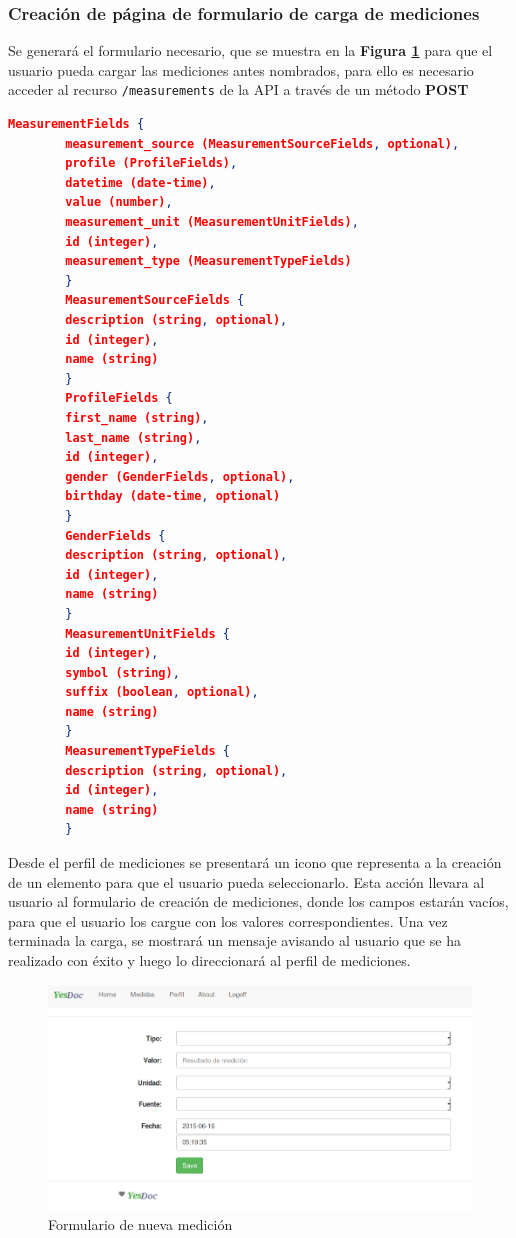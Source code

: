 \subsubsection{Creación de página de formulario de carga de mediciones}
Se generará el formulario necesario, que se muestra en la \textbf{Figura \ref{nueva_medicion}} para que el usuario pueda cargar las mediciones antes nombrados, para ello es necesario acceder al recurso \texttt{/measurements} de la API a través de un método \textbf{POST}

      \begin{lstlisting}[language=json,firstnumber=1]
         MeasurementFields {
        measurement_source (MeasurementSourceFields, optional),
        profile (ProfileFields),
        datetime (date-time),
        value (number),
        measurement_unit (MeasurementUnitFields),
        id (integer),
        measurement_type (MeasurementTypeFields)
        }
        MeasurementSourceFields {
        description (string, optional),
        id (integer),
        name (string)
        }
        ProfileFields {
        first_name (string),
        last_name (string),
        id (integer),
        gender (GenderFields, optional),
        birthday (date-time, optional)
        }
        GenderFields {
        description (string, optional),
        id (integer),
        name (string)
        }
        MeasurementUnitFields {
        id (integer),
        symbol (string),
        suffix (boolean, optional),
        name (string)
        }
        MeasurementTypeFields {
        description (string, optional),
        id (integer),
        name (string)
        } 
    \end{lstlisting}
    
Desde el perfil de mediciones se presentará un icono que representa a la creación de un elemento para que el usuario pueda seleccionarlo. Esta acción llevara al usuario al formulario de creación de mediciones, donde los campos estarán vacíos, para que el usuario los cargue con los valores correspondientes. Una vez terminada la carga, se mostrará un mensaje avisando al usuario que se ha realizado con éxito y luego lo direccionará al perfil de mediciones.
    
    \begin{figure}[h]
        \centering
        \includegraphics[width=1\textwidth]{img/2-nueva_medicion}
        \caption{Formulario de nueva medición}
		\label{nueva_medicion}
    \end{figure}
